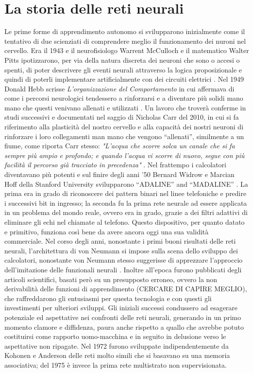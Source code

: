 \section*{La storia delle reti neurali}
Le prime forme di apprendimento autonomo si svilupparono inizialmente come il tentativo di due scienziati di  comprendere meglio il funzionamento dei nuroni nel cervello.
Era il 1943 e il neurofisiologo Warrent McCulloch e il matematico Walter Pitts ipotizzarono, per via della natura discreta dei neuroni che sono o accesi o spenti, di poter descrivere gli eventi neurali attraverso la logica proposizionale e quindi di poterli implementare artificialmente con dei circuiti elettrici \cite{mcculloch1943logical}.
Nel 1949 Donald Hebb scrisse \textit{L'organizzazione del Comportamento} in cui affermava di come i percorsi neurologici tendessero a rinforzarsi e a diventare più solidi mano mano che questi venivano allenati e utilizzati \cite{hebb1961organization}. Un lavoro che troverà conferme in studi successivi e documentati nel saggio di Nicholas Carr del 2010, in cui si fa riferimento alla plasticità del nostro cervello e alla capacità dei nostri neuroni di rinforzare i loro collegamenti man mano che vengono ``allenati'', similmente a un fiume, come riporta Carr stesso: \emph{"L'acqua che scorre solca un canale che si fa sempre più ampio e profondo; e quando l'acqua vi scorre di nuovo, segue con più facilità il percorso già tracciato in precedenza"} \cite{carr2010shallows}.
Nel frattempo i calcolatori diventavano più potenti e sul finire degli anni '50 Bernard Widrow e Marcian Hoff della Stanford University svilupparono ``ADALINE'' and ``MADALINE'' \cite{widrow1960adaptive}. La prima era in grado di riconoscere dei pattern binari nel linee telefoniche e predire i successivi bit in ingresso; la seconda fu la prima rete neurale ad essere applicata in un problema del mondo reale, ovvero era in grado, grazie a dei filtri adattivi di eliminare gli echi nel chiamate al telefono. Questo dispositivo, per quanto datato e primitivo, funziona così bene da avere ancora oggi una sua validità commerciale.
Nel corso degli anni, nonostante i primi buoni risultati delle reti neurali, l'architettura di von Neumann si impose sulla scena dello sviluppo dei calcolatori, nonostante von Neumann stesso suggerisse di apprezzare l'approccio dell'imitazione delle funzionali neurali \cite{stanford_history}.
Inoltre all'epoca furono pubblicati degli articoli scientifici, basati però su un presupposto erroneo, ovvero la non derivabilità delle funzioni di apprendimento (CERCARE DI CAPIRE MEGLIO), che raffreddarono gli entusiasmi per questa tecnologia e con questi gli investimenti per ulteriori sviluppi. Gli iniziali successi condussero ad esagerare potenziale ed aspettative nei confronti delle reti neurali, generando in un primo momento clamore e diffidenza, paura anche rispetto a quallo che avrebbe potuto costituirsi come rapporto uomo-macchina e in seguito in delusione verso le aspettative non ripagate. 
Nel 1972 furono sviluppate indipendentemente da Kohonen e Anderson delle reti molto simili che si basavano su una memoria associativa\cite{kohonen1972correlation}; del 1975 è invece la prima rete multistrato non supervisionata.

